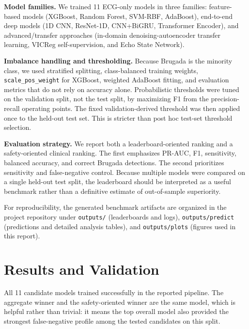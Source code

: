 \documentclass[10pt,twocolumn]{article}
\let\originaltexttt\texttt
\renewcommand{\texttt}[1]{%
  \begingroup
  \setlength{\fboxsep}{1.2pt}%
  \colorbox{inlinecodebg}{\originaltexttt{#1}}%
  \endgroup
}
\begin{document}
\textbf{Model families.} We trained 11 ECG-only models in three families: feature-based models (XGBoost, Random Forest, SVM-RBF, AdaBoost), end-to-end deep models (1D CNN, ResNet-1D, CNN+BiGRU, Transformer Encoder), and advanced/transfer approaches (in-domain denoising-autoencoder transfer learning, VICReg self-supervision, and Echo State Network).

\textbf{Imbalance handling and thresholding.} Because Brugada is the minority class, we used stratified splitting, class-balanced training weights, \texttt{scale\_pos\_weight} for XGBoost, weighted AdaBoost fitting, and evaluation metrics that do not rely on accuracy alone. Probabilistic thresholds were tuned on the validation split, not the test split, by maximizing F1 from the precision-recall operating points. The fixed validation-derived threshold was then applied once to the held-out test set. This is stricter than post hoc test-set threshold selection.

\textbf{Evaluation strategy.} We report both a leaderboard-oriented ranking and a safety-oriented clinical ranking. The first emphasizes PR-AUC, F1, sensitivity, balanced accuracy, and correct Brugada detections. The second prioritizes sensitivity and false-negative control. Because multiple models were compared on a single held-out test split, the leaderboard should be interpreted as a useful benchmark rather than a definitive estimate of out-of-sample superiority.

For reproducibility, the generated benchmark artifacts are organized in the project repository \cite{idsc2026repo} under \texttt{outputs/} (leaderboards and logs), \texttt{outputs/predict} (predictions and detailed analysis tables), and \texttt{outputs/plots} (figures used in this report).

\section{Results and Validation}
All 11 candidate models trained successfully in the reported pipeline. The aggregate winner and the safety-oriented winner are the same model, which is helpful rather than trivial: it means the top overall model also provided the strongest false-negative profile among the tested candidates on this split.

\begin{table}[!t]
\centering
\caption{Held-out test comparison between the best aggregate model and the best safety-oriented clinical candidate.}
\label{tab:main-results}
\scriptsize
\setlength{\tabcolsep}{2.5pt}
\end{table}
\end{document}
